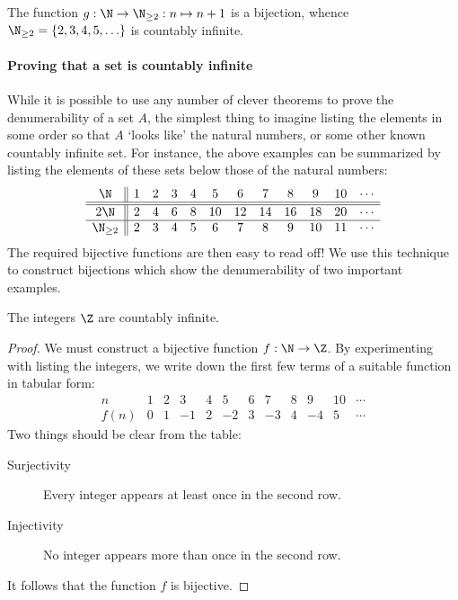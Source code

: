 \begin{example}
The function $g:\N\to\N_{\ge 2}:n\mapsto n+1$ is a bijection, whence $\N_{\ge 2}=\{2,3,4,5,\ldots\}$ is countably infinite.
\end{example}



\paragraph{Proving that a set is countably infinite}

While it is possible to use any number of clever theorems to prove the denumerability of a set $A$, the simplest thing to imagine listing the elements in some order so that $A$ `looks like' the natural numbers, or some other known countably infinite set. For instance, the above examples can be summarized by listing the elements of these sets below those of the natural numbers:
\[\begin{array}{c||ccccccccccc}
\N&1&2&3&4&5&6&7&8&9&10&\cdots\\\hline\hline
2\N&2&4&6&8&10&12&14&16&18&20&\cdots\\\hline
\N_{\ge 2}&2&3&4&5&6&7&8&9&10&11&\cdots
\end{array}\]
The required bijective functions are then easy to read off! We use this technique to construct bijections which show the denumerability of two important examples.

\begin{thm}\label{thm:zcount}
The integers $\Z$ are countably infinite.
\end{thm}

\begin{proof}
We must construct a bijective function $f:\N\to\Z$. By experimenting with listing the integers, we write down the first few terms of a suitable function in tabular form:
\[\begin{array}{c|ccccccccccc}
n&1&2&3&4&5&6&7&8&9&10&\cdots\\\hline
f(n)&0&1&-1&2&-2&3&-3&4&-4&5&\cdots
\end{array}\]
Two things should be clear from the table:
\begin{description}
\item[Surjectivity]\quad Every integer appears at least once in the second row.
\item[Injectivity]\quad No integer appears more than once in the second row.
\end{description}
It follows that the function $f$ is bijective.
\end{proof}

